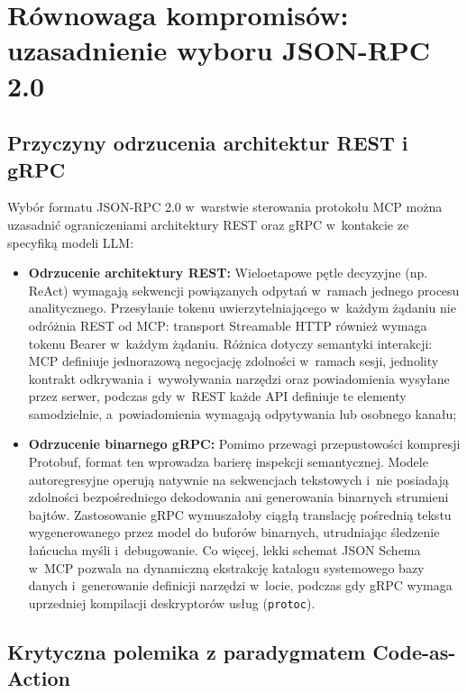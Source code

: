 \section{Równowaga kompromisów: uzasadnienie wyboru JSON-RPC 2.0}
\label{sec:protokoly_kompromis_inzynierski}

\subsection{Przyczyny odrzucenia architektur REST i gRPC}
\label{subsec:protokoly_odrzucenie_rest_grpc}

Wybór formatu JSON-RPC 2.0 w~warstwie sterowania protokołu MCP można uzasadnić ograniczeniami architektury REST oraz gRPC w~kontakcie ze specyfiką modeli LLM:
\begin{itemize}
    \item \textbf{Odrzucenie architektury REST:} Wieloetapowe pętle decyzyjne (np. ReAct) wymagają sekwencji powiązanych odpytań w~ramach jednego procesu analitycznego. Przesyłanie tokenu uwierzytelniającego w~każdym żądaniu nie odróżnia REST od MCP: transport Streamable HTTP również wymaga tokenu Bearer w~każdym żądaniu. Różnica dotyczy semantyki interakcji: MCP definiuje jednorazową negocjację zdolności w~ramach sesji, jednolity kontrakt odkrywania i~wywoływania narzędzi oraz powiadomienia wysyłane przez serwer, podczas gdy w~REST każde API definiuje te elementy samodzielnie, a~powiadomienia wymagają odpytywania lub osobnego kanału;
    \item \textbf{Odrzucenie binarnego gRPC:} Pomimo przewagi przepustowości kompresji Protobuf, format ten wprowadza barierę inspekcji semantycznej. Modele autoregresyjne operują natywnie na sekwencjach tekstowych i~nie posiadają zdolności bezpośredniego dekodowania ani generowania binarnych strumieni bajtów. Zastosowanie gRPC wymuszałoby ciągłą translację pośrednią tekstu wygenerowanego przez model do buforów binarnych, utrudniając śledzenie łańcucha myśli i~debugowanie. Co więcej, lekki schemat JSON Schema w~MCP pozwala na dynamiczną ekstrakcję katalogu systemowego bazy danych i~generowanie definicji narzędzi w~locie, podczas gdy gRPC wymaga uprzedniej kompilacji deskryptorów usług (\texttt{protoc}).
\end{itemize}

\subsection{Krytyczna polemika z paradygmatem Code-as-Action}
\label{subsec:protokoly_codeact_polemika}

